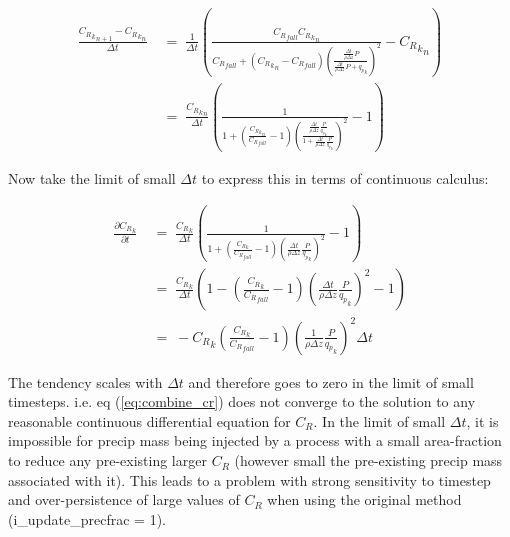 \documentclass{UMDP_article}
\begin{document}
\begin{align}
\frac{ {{C_R}_k}_{n+1} - {{C_R}_k}_n }{\Delta t}
 & \; = \; \frac{1}{\Delta t} \left(
                 \frac{ {C_R}_{fall} {{C_R}_k}_n }
                      { {C_R}_{fall} + \left( {{C_R}_k}_n - {C_R}_{fall} \right)
                    \left( \frac{ \frac{\Delta t}{\rho \Delta z} P }
                                { \frac{\Delta t}{\rho \Delta z} P + {q_p}_k }
                    \right)^2 }
                - {{C_R}_k}_n \right)
\nonumber \\
 & \; = \; \frac{{{C_R}_k}_n}{\Delta t} \left(
                 \frac{ 1 }
                      { 1 + \left( \frac{{{C_R}_k}_n}{{C_R}_{fall}} - 1 \right)
                    \left(
               \frac{     \frac{\Delta t}{\rho \Delta z} \frac{P}{{q_p}_k} }
                    { 1 + \frac{\Delta t}{\rho \Delta z} \frac{P}{{q_p}_k} }
                    \right)^2 }
                                   - 1 \right)
\nonumber
\end{align}

Now take the limit of small $\Delta t$ to express this in terms of
continuous calculus:

\begin{align}
\frac{ \partial {C_R}_k }{ \partial t}
 & \; = \; \frac{{C_R}_k}{\Delta t} \left(
                 \frac{ 1 }
                      { 1 + \left( \frac{{C_R}_k}{{C_R}_{fall}} - 1 \right)
            \left( \frac{\Delta t}{\rho \Delta z} \frac{P}{{q_p}_k} \right)^2 }
                                   - 1 \right)
\nonumber \\
 & \; = \; \frac{{C_R}_k}{\Delta t} \left(
                1 - \left( \frac{{C_R}_k}{{C_R}_{fall}} - 1 \right)
            \left( \frac{\Delta t}{\rho \Delta z} \frac{P}{{q_p}_k} \right)^2
                                   - 1 \right)
\nonumber \\
 & \; = \; - {C_R}_k \left( \frac{{C_R}_k}{{C_R}_{fall}} - 1 \right)
            \left( \frac{1}{\rho \Delta z} \frac{P}{{q_p}_k} \right)^2
            \Delta t
\nonumber
\end{align}

The tendency scales with $\Delta t$ and therefore goes to zero
in the limit of small timesteps.
i.e. eq (\ref{eq:combine_cr}) does not converge to the solution to any
reasonable continuous differential equation for $C_R$.
In the limit of small $\Delta t$,
it is impossible for precip mass being injected by a process with a small
area-fraction to reduce any pre-existing larger $C_R$
(however small the pre-existing precip mass associated with it).
This leads to a problem with strong sensitivity to timestep and
over-persistence of large values of $C_R$ when using the original method
(i\_update\_precfrac = 1).
\end{document}

